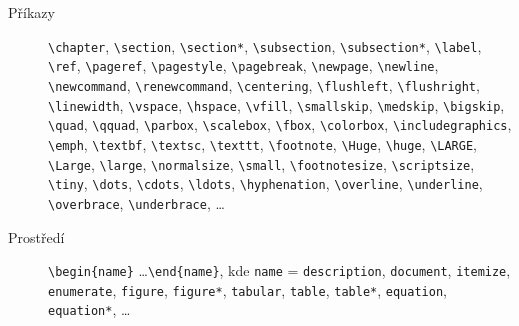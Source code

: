 \documentclass[a4paper,11pt, twoside]{report}
\begin{document}
\begin{description}
\item[Příkazy] 
\verb|\chapter|,
\verb|\section|,
\verb|\section*|,
\verb|\subsection|,
\verb|\subsection*|,
%
\verb|\label|,
\verb|\ref|,
\verb|\pageref|,
%
\verb|\pagestyle|,
\verb|\pagebreak|,
\verb|\newpage|,
\verb|\newline|,
\verb|\newcommand|,
\verb|\renewcommand|,
%
\verb|\centering|,
\verb|\flushleft|,
\verb|\flushright|,
\verb|\linewidth|,
\verb|\vspace|,
\verb|\hspace|,
\verb|\vfill|,
\verb|\smallskip|,
\verb|\medskip|,
\verb|\bigskip|,
\verb|\quad|,
\verb|\qquad|,
%
\verb|\parbox|,
\verb|\scalebox|,
\verb|\fbox|,
\verb|\colorbox|,
\verb|\includegraphics|,
%
\verb|\emph|,
\verb|\textbf|,
\verb|\textsc|,
\verb|\texttt|,
\verb|\footnote|,
%
\verb|\Huge|,
\verb|\huge|,
\verb|\LARGE|,
\verb|\Large|,
\verb|\large|,
\verb|\normalsize|,
\verb|\small|,
\verb|\footnotesize|,
\verb|\scriptsize|,
\verb|\tiny|,
%
\verb|\dots|,
\verb|\cdots|,
\verb|\ldots|,
\verb|\hyphenation|,
\verb|\overline|,
\verb|\underline|,
\verb|\overbrace|,
\verb|\underbrace|, 
\dots
\end{description}



\begin{description}
\item[Prostředí] 
\verb|\begin{name}| \ldots \verb|\end{name}|,
kde
\verb|name| =  
\verb|description|,
\verb|document|,
\verb|itemize|,
\verb|enumerate|,
\verb|figure|,
\verb|figure*|,
\verb|tabular|,
\verb|table|,
\verb|table*|,
\verb|equation|,
\verb|equation*|,
\dots
\end{description}


\label{lastpage}
\end{document}
